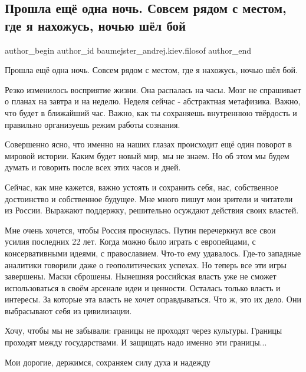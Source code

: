  
 
 
 
 
 
\subsection{Прошла ещё одна ночь. Совсем рядом с местом, где я нахожусь, ночью шёл бой}
\label{sec:26_02_2022.fb.baumejster_andrej.kiev.filosof.1.proshla_esche_odna_noch}
 
\ifcmt
 author_begin
   author_id baumejster_andrej.kiev.filosof
 author_end
\fi

Прошла ещё одна ночь. Совсем рядом с местом, где я нахожусь, ночью шёл бой.

Резко изменилось восприятие жизни. Она распалась на часы. Мозг не спрашивает о
планах на завтра и на неделю. Неделя сейчас - абстрактная метафизика. Важно,
что будет в ближайший час. Важно, как ты сохраняешь внутреннюю твёрдость и
правильно организуешь режим работы сознания.

Совершенно ясно, что именно на наших глазах происходит ещё один поворот в
мировой истории. Каким будет новый мир, мы не знаем. Но об этом мы будем думать
и говорить после всех этих часов и дней.

Сейчас, как мне кажется, важно устоять и сохранить себя, нас, собственное
достоинство и собственное будущее. Мне много пишут мои зрители и читатели из
России. Выражают поддержку, решительно осуждают действия своих властей.

Мне очень хочется, чтобы Россия проснулась. Путин перечеркнул все свои усилия
последних 22 лет. Когда можно было играть с европейцами, с консервативными
идеями, с православием. Что-то ему удавалось. Где-то западные аналитики
говорили даже о геополитических успехах. Но теперь все эти игры завершены.
Маски сброшены. Нынешняя российская власть уже не сможет использоваться в своём
арсенале идеи и ценности. Осталась только власть и интересы. За которые эта
власть не хочет оправдываться. Что ж, это их дело. Они выбрасывают себя из
цивилизации. 

Хочу, чтобы мы не забывали: границы не проходят через культуры. Границы
проходят между государствами. И защищать надо именно эти границы...

Мои дорогие, держимся, сохраняем силу духа и надежду

